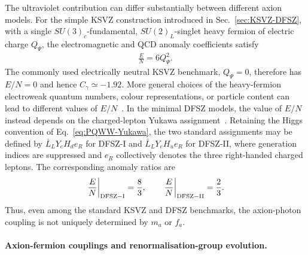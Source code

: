 \documentclass[review]{elsarticle}
\numberwithin{equation}{section}
\numberwithin{table}{section}
\numberwithin{figure}{section}
\begin{document}
The ultraviolet contribution can differ substantially between different axion models. For the simple KSVZ construction introduced in Sec.~\ref{sec:KSVZ-DFSZ}, with a single $SU(3)_c$-fundamental, $SU(2)_L$-singlet heavy fermion of electric charge $Q_\Psi$, the electromagnetic and QCD anomaly coefficients satisfy
\begin{align}
    \frac{E}{N} = 6Q_\Psi^2.
    \label{eq:KSVZ-EN}
\end{align}
The commonly used electrically neutral KSVZ benchmark, $Q_\Psi=0$, therefore has $E/N=0$ and hence $C_\gamma\simeq-1.92$. More general choices of the heavy-fermion electroweak quantum numbers, colour representations, or particle content can lead to different values of $E/N$~\cite{Kim:2008hd,DiLuzio:2020wdo,DiLuzio:2017pfr}. In the minimal DFSZ models, the value of $E/N$ instead depends on the charged-lepton Yukawa assignment~\cite{DiLuzio:2020wdo,Sun:2020iim}. Retaining the Higgs convention of Eq.~\eqref{eq:PQWW-Yukawa}, the two standard assignments may be defined by
$\bar L_LY_eH_de_R$ for DFSZ-I and $\bar L_LY_eH_ue_R$ for DFSZ-II, where generation indices are suppressed and $e_R$ collectively denotes the three right-handed charged leptons. The corresponding anomaly ratios are
\begin{align}
    \left.\frac{E}{N}\right|_{\rm DFSZ-I} = \frac{8}{3},
    \qquad
    \left.\frac{E}{N}\right|_{\rm DFSZ-II} = \frac{2}{3}.
    \label{eq:DFSZ-EN}
\end{align}
Thus, even among the standard KSVZ and DFSZ benchmarks, the axion-photon coupling is not uniquely determined by $m_a$ or $f_a$.

\paragraph{Axion-fermion couplings and renormalisation-group evolution.}
\end{document}
